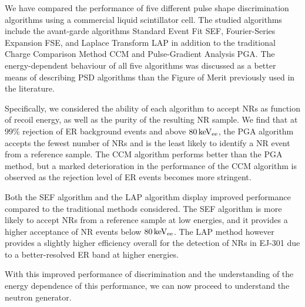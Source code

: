 We have compared the performance of five different pulse shape discrimination algorithms using a commercial liquid scintillator cell. The studied algorithms include the avant-garde algorithms Standard Event Fit SEF, Fourier-Series Expansion FSE, and Laplace Transform LAP in addition to the traditional Charge Comparison Method CCM and Pulse-Gradient Analysis PGA. The energy-dependent behaviour of all five algorithms was discussed as a better means of describing PSD algorithms than the Figure of Merit previously used in the literature.

Specifically, we considered the ability of each algorithm to accept NRs as function of recoil energy, as well as the purity of the resulting NR sample. We find that at $99\%$ rejection of ER background events and above $80\,\mathrm{keV_{ee}}$, the PGA algorithm accepts the fewest number of NRs and is the least likely to identify a NR event from a reference sample. The CCM algorithm performs better than the PGA method, but a marked deterioration in the performance of the CCM algorithm is observed as the rejection level of ER events becomes more stringent.

Both the SEF algorithm and the LAP algorithm display improved performance compared to the traditional methods considered. The SEF algorithm is more likely to accept NRs from a reference sample at low energies, and it provides a higher acceptance of NR events below $80\,\mathrm{keV_{ee}}$. The LAP method however provides a slightly higher efficiency overall for the detection of NRs in EJ-301 due to a better-resolved ER band at higher energies.

With this improved performance of discrimination and the understanding of the energy dependence of this performance, we can now proceed to understand the neutron generator.
